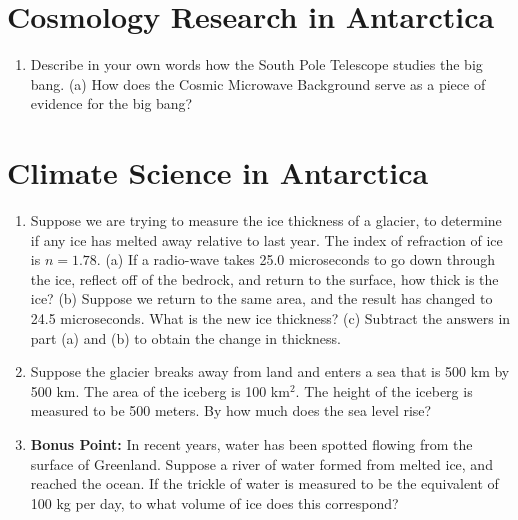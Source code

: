 \documentclass[10pt]{article}
\begin{document}
\section{Cosmology Research in Antarctica}

\begin{enumerate}
\item Describe in your own words how the South Pole Telescope studies the big bang.  (a) How does the Cosmic Microwave Background serve as a piece of evidence for the big bang? \\ \vspace{2cm}
\end{enumerate}

\section{Climate Science in Antarctica}

\begin{enumerate}
\item Suppose we are trying to measure the ice thickness of a glacier, to determine if any ice has melted away relative to last year.  The index of refraction of ice is $n = 1.78$. (a) If a radio-wave takes 25.0 microseconds to go down through the ice, reflect off of the bedrock, and return to the surface, how thick is the ice? (b) Suppose we return to the same area, and the result has changed to 24.5 microseconds.  What is the new ice thickness?  (c) Subtract the answers in part (a) and (b) to obtain the change in thickness. \\ \vspace{2cm}
\item Suppose the glacier breaks away from land and enters a sea that is 500 km by 500 km.  The area of the iceberg is 100 km$^2$.  The height of the iceberg is measured to be 500 meters.  By how much does the sea level rise? \\ \vspace{2cm}
\item \textbf{Bonus Point:} In recent years, water has been spotted flowing from the surface of Greenland.  Suppose a river of water formed from melted ice, and reached the ocean.  If the trickle of water is measured to be the equivalent of 100 kg per day, to what volume of ice does this correspond? 
\end{enumerate}
\end{document}
